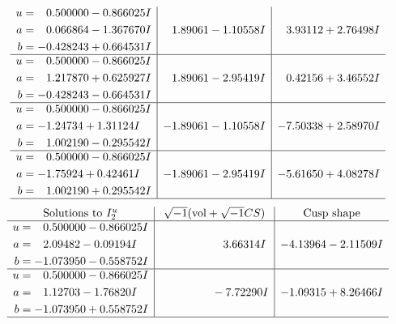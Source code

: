 \documentclass[1p]{elsarticle_modified}
\theoremstyle{definition}
\newcommand{\I}{\sqrt{-1}}
\begin{document}
$$\begin{array}{c|c|c}
\begin{aligned}
u &= \phantom{-}0.500000 - 0.866025 I \\
a &= \phantom{-}0.066864 - 1.367670 I \\
b &= -0.428243 + 0.664531 I\end{aligned}
 & \phantom{-}1.89061 - 1.10558 I & \phantom{-}3.93112 + 2.76498 I \\ \hline\begin{aligned}
u &= \phantom{-}0.500000 - 0.866025 I \\
a &= \phantom{-}1.217870 + 0.625927 I \\
b &= -0.428243 - 0.664531 I\end{aligned}
 & \phantom{-}1.89061 - 2.95419 I & \phantom{-}0.42156 + 3.46552 I \\ \hline\begin{aligned}
u &= \phantom{-}0.500000 - 0.866025 I \\
a &= -1.24734 + 1.31124 I \\
b &= \phantom{-}1.002190 - 0.295542 I\end{aligned}
 & -1.89061 - 1.10558 I & -7.50338 + 2.58970 I \\ \hline\begin{aligned}
u &= \phantom{-}0.500000 - 0.866025 I \\
a &= -1.75924 + 0.42461 I \\
b &= \phantom{-}1.002190 + 0.295542 I\end{aligned}
 & -1.89061 - 2.95419 I & -5.61650 + 4.08278 I\\
 \hline 
 \end{array}$$\newpage$$\begin{array}{c|c|c}  
\text{Solutions to }I^u_{2}& \I (\text{vol} + \sqrt{-1}CS) & \text{Cusp shape}\\
 \hline 
\begin{aligned}
u &= \phantom{-}0.500000 - 0.866025 I \\
a &= \phantom{-}2.09482 - 0.09194 I \\
b &= -1.073950 - 0.558752 I\end{aligned}
 & \phantom{-0.000000 -}3.66314 I & -4.13964 - 2.11509 I \\ \hline\begin{aligned}
u &= \phantom{-}0.500000 - 0.866025 I \\
a &= \phantom{-}1.12703 - 1.76820 I \\
b &= -1.073950 + 0.558752 I\end{aligned}
 & \phantom{-0.000000 } -7.72290 I & -1.09315 + 8.26466 I\\
 \hline 
 \end{array}$$\newpage
\end{document}
